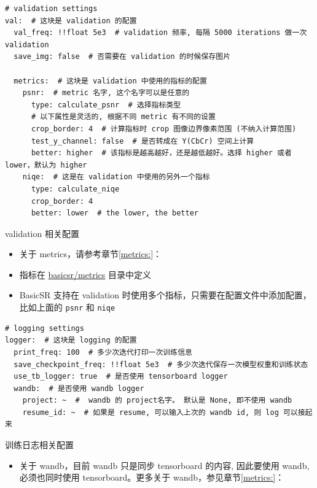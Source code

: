 \documentclass[../main.tex]{subfiles}
\begin{document}
\begin{verbatim}
# validation settings
val:  # 这块是 validation 的配置
  val_freq: !!float 5e3  # validation 频率, 每隔 5000 iterations 做一次 validation
  save_img: false  # 否需要在 validation 的时候保存图片

  metrics:  # 这块是 validation 中使用的指标的配置
    psnr:  # metric 名字, 这个名字可以是任意的
      type: calculate_psnr  # 选择指标类型
      # 以下属性是灵活的, 根据不同 metric 有不同的设置
      crop_border: 4  # 计算指标时 crop 图像边界像素范围 (不纳入计算范围)
      test_y_channel: false  # 是否转成在 Y(CbCr) 空间上计算
      better: higher  # 该指标是越高越好，还是越低越好。选择 higher 或者 lower，默认为 higher
    niqe:  # 这是在 validation 中使用的另外一个指标
      type: calculate_niqe
      crop_border: 4
      better: lower  # the lower, the better
\end{verbatim}

\begin{exampleBox}[righthand ratio=0.00, sidebyside, sidebyside align=center, lower separated=false]{validation 相关配置}
    \begin{itemize}
        \item 关于 metrics，请参考章节\ref{metrics:}： 
        \item 指标在 \href{https://github.com/XPixelGroup/BasicSR/tree/master/basicsr/metrics}{basicsr/metrics} 目录中定义
        \item BasicSR 支持在 validation 时使用多个指标，只需要在配置文件中添加配置，比如上面的 \texttt{psnr} 和 \texttt{niqe}
    \end{itemize}
\end{exampleBox}

\begin{verbatim}
# logging settings
logger:  # 这块是 logging 的配置
  print_freq: 100  # 多少次迭代打印一次训练信息
  save_checkpoint_freq: !!float 5e3  # 多少次迭代保存一次模型权重和训练状态
  use_tb_logger: true  # 是否使用 tensorboard logger
  wandb:  # 是否使用 wandb logger
    project: ~  #  wandb 的 project名字。 默认是 None, 即不使用 wandb
    resume_id: ~  # 如果是 resume, 可以输入上次的 wandb id, 则 log 可以接起来
\end{verbatim}

\begin{exampleBox}[righthand ratio=0.00, sidebyside, sidebyside align=center, lower separated=false]{训练日志相关配置}
    \begin{itemize}
        \item 关于 wandb，目前 wandb 只是同步 tensorboard 的内容, 因此要使用 wandb, 必须也同时使用 tensorboard。更多关于 wandb，参见章节\ref{metrics:}： 
    \end{itemize}
\end{exampleBox}
\end{document}
